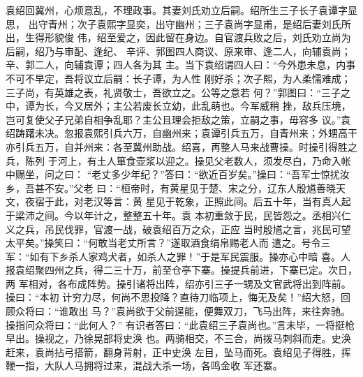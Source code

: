袁绍回冀州，心烦意乱，不理政事。其妻刘氏劝立后嗣。绍所生三子长子袁谭字显思，
出守青州；次子袁熙字显奕，出守幽州；三子袁尚字显甫，是绍后妻刘氏所出，生得形貌俊
伟，绍至爱之，因此留在身边。自官渡兵败之后，刘氏劝立尚为后嗣，绍乃与审配、逢纪、
辛评、郭图四人商议、原来审、逢二人，向辅袁尚；辛、郭二人，向辅袁谭；四人各为其
主。当下袁绍谓四人曰：“今外患未息，内事不可不早定，吾将议立后嗣：长子谭，为人性
刚好杀；次子熙，为人柔懦难成；三子尚，有英雄之表，礼贤敬士，吾欲立之。公等之意若
何？”郭图曰：“三子之中，谭为长，今又居外；主公若废长立幼，此乱萌也。今军威稍
挫，敌兵压境，岂可复使父子兄弟自相争乱耶？主公且理会拒敌之策，立嗣之事，毋容多
议。”袁绍踌躇未决。忽报袁熙引兵六万，自幽州来；袁谭引兵五万，自青州来；外甥高干
亦引兵五万，自并州来：各至冀州助战。绍喜，再整人马来战曹操。时操引得胜之兵，陈列
于河上，有土人箪食壶浆以迎之。操见父老数人，须发尽白，乃命入帐中赐坐，问之曰：
“老丈多少年纪？”答曰：“欲近百岁矣。”操曰：“吾军士惊扰汝乡，吾甚不安。”父老
曰：“桓帝时，有黄星见于楚、宋之分，辽东人殷馗善晓天文，夜宿于此，对老汉等言：黄
星见于乾象，正照此间。后五十年，当有真人起于梁沛之间。今以年计之，整整五十年。袁
本初重敛于民，民皆怨之。丞相兴仁义之兵，吊民伐罪，官渡一战，破袁绍百万之众，正应
当时殷馗之言，兆民可望太平矣。”操笑曰：“何敢当老丈所言？”遂取酒食绢帛赐老人而
遣之。号令三军：“如有下乡杀人家鸡犬者，如杀人之罪！”于是军民震服。操亦心中暗
喜。人报袁绍聚四州之兵，得二三十万，前至仓亭下寨。操提兵前进，下寨已定。次日，两
军相对，各布成阵势。操引诸将出阵，绍亦引三子一甥及文官武将出到阵前。操曰：“本初
计穷力尽，何尚不思投降？直待刀临项上，悔无及矣！”绍大怒，回顾众将曰：“谁敢出
马？”袁尚欲于父前逞能，便舞双刀，飞马出阵，来往奔驰。操指问众将曰：“此何人？”
有识者答曰：“此袁绍三子袁尚也。”言未毕，一将挺枪早出。操视之，乃徐晃部将史涣
也。两骑相交，不三合，尚拨马刺斜而走。史涣赶来，袁尚拈弓搭箭，翻身背射，正中史涣
左目，坠马而死。袁绍见子得胜，挥鞭一指，大队人马拥将过来，混战大杀一场，各鸣金收
军还寨。

